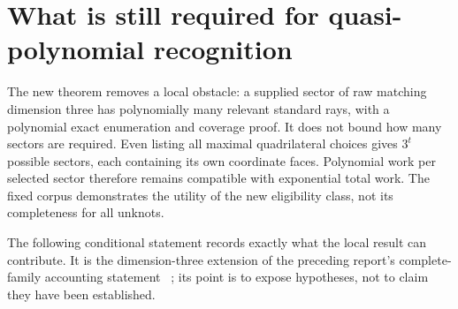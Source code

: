 \section{What is still required for quasi-polynomial recognition}
\label{sec:research}

The new theorem removes a local obstacle: a supplied sector of raw
matching dimension three has polynomially many relevant standard
rays, with a polynomial exact enumeration and coverage proof.
It does not bound how many sectors are required.  Even listing all
maximal quadrilateral choices gives \(3^t\) possible sectors, each
containing its own coordinate faces.  Polynomial work per selected
sector therefore remains compatible with exponential total work.
The fixed corpus demonstrates the utility of the new eligibility
class, not its completeness for all unknots.

The following conditional statement records exactly what the
local result can contribute.  It is the dimension-three extension
of the preceding report's complete-family accounting statement
~\cite{MinimumEnvelopes}; its point is to expose hypotheses, not to
claim they have been established.

